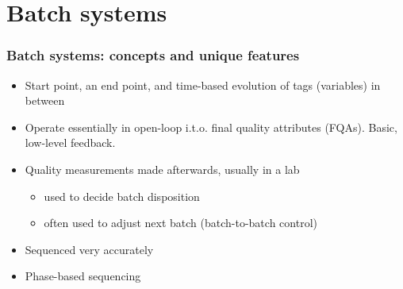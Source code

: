 \documentclass[handout, 12pt]{beamer}
\begin{document}
\section{Batch systems}

\begin{frame}\frametitle{Batch systems: concepts and unique features}

\begin{itemize}
	\item 	Start point, an end point, and time-based evolution of tags (variables) in between 
	
	\item 	Operate essentially in open-loop i.t.o. final quality attributes (FQAs).  Basic, low-level feedback. \pause
	
	\item 	Quality measurements made afterwards, usually in a lab
	
			\begin{itemize}
				\item	used to decide batch disposition
				\item	often used to adjust next batch (batch-to-batch control)
			\end{itemize}\pause
			
	\item	Sequenced very accurately
	
	\item	Phase-based sequencing

\end{itemize}
\end{frame}
\end{document}
